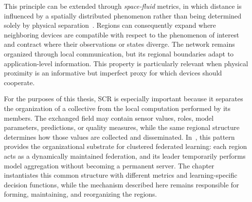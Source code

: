This principle can be extended through \emph{space-fluid} metrics, in which
 distance is influenced by a spatially distributed phenomenon rather than being
 determined solely by physical separation~\cite{DBLP:journals/lmcs/CasadeiMPVZ23}.
%
Regions can consequently expand where neighboring devices are compatible with
 respect to the phenomenon of interest and contract where their observations or
 states diverge.
%
The network remains organized through local communication, but its regional
 boundaries adapt to application-level information.
%
This property is particularly relevant when physical proximity is an
 informative but imperfect proxy for which devices should cooperate.

For the purposes of this thesis,
 \gls{SCR} is especially important because it separates the organization of a
 collective from the local computation performed by its members.
%
The exchanged field may contain sensor values, roles, model parameters,
 predictions, or quality measures, while the same regional structure determines
 how those values are collected and disseminated.
%
In~, this pattern provides the organizational substrate
 for clustered federated learning: each region acts as a dynamically maintained
 federation, and its leader temporarily performs model aggregation without
 becoming a permanent server.
%
The chapter instantiates this common structure with different metrics and
 learning-specific decision functions, while the mechanism described here
 remains responsible for forming, maintaining, and reorganizing the regions.

